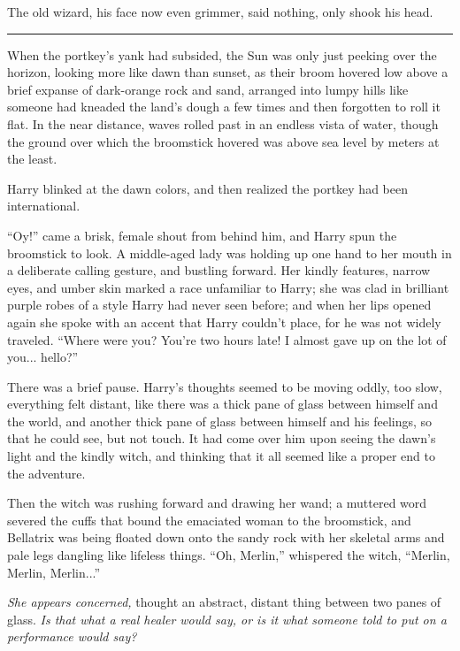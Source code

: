 The old wizard, his face now even grimmer, said nothing, only shook his
head.

\begin{center}\rule{3in}{0.4pt}\end{center}

When the portkey's yank had subsided, the Sun was only just peeking over
the horizon, looking more like dawn than sunset, as their broom hovered
low above a brief expanse of dark-orange rock and sand, arranged into
lumpy hills like someone had kneaded the land's dough a few times and
then forgotten to roll it flat. In the near distance, waves rolled past
in an endless vista of water, though the ground over which the
broomstick hovered was above sea level by meters at the least.

Harry blinked at the dawn colors, and then realized the portkey had been
international.

``Oy!'' came a brisk, female shout from behind him, and Harry spun the
broomstick to look. A middle-aged lady was holding up one hand to her
mouth in a deliberate calling gesture, and bustling forward. Her kindly
features, narrow eyes, and umber skin marked a race unfamiliar to Harry;
she was clad in brilliant purple robes of a style Harry had never seen
before; and when her lips opened again she spoke with an accent that
Harry couldn't place, for he was not widely traveled. ``Where were you?
You're two hours late! I almost gave up on the lot of you...
hello?''

There was a brief pause. Harry's thoughts seemed to be moving oddly, too
slow, everything felt distant, like there was a thick pane of glass
between himself and the world, and another thick pane of glass between
himself and his feelings, so that he could see, but not touch. It had
come over him upon seeing the dawn's light and the kindly witch, and
thinking that it all seemed like a proper end to the adventure.

Then the witch was rushing forward and drawing her wand; a muttered word
severed the cuffs that bound the emaciated woman to the broomstick, and
Bellatrix was being floated down onto the sandy rock with her skeletal
arms and pale legs dangling like lifeless things. ``Oh, Merlin,''
whispered the witch, ``Merlin, Merlin, Merlin...''

\emph{She appears concerned,} thought an abstract, distant thing between
two panes of glass. \emph{Is that what a real healer would say, or is it
what someone told to put on a performance would say?}

